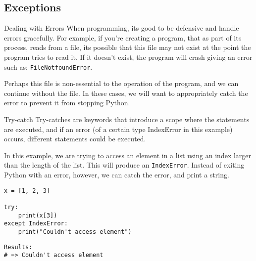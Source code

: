 \documentclass[10pt]{beamer}
\begin{document}
\subsection{Exceptions}
\label{sec:org1ebb98f}

\begin{frame}[label={sec:org4302f1e},fragile]{Dealing with Errors}
 When programming, its good to be defensive and handle errors gracefully. For example,
if you're creating a program, that as part of its process, reads from a file, its
possible that this file may not exist at the point the program tries to read it. If
it doesn't exist, the program will crash giving an error such as: \texttt{FileNotfoundError}.

Perhaps this file is non-essential to the operation of the program, and we can
continue without the file. In these cases, we will want to appropriately catch the
error to prevent it from stopping Python.
\end{frame}

\begin{frame}[label={sec:org99543ba},fragile]{Try-catch}
 Try-catches are keywords that introduce a scope where the statements are executed,
and if an error (of a certain type IndexError in this example) occurs, different
statements could be executed.

In this example, we are trying to access an element in a list using an index larger
than the length of the list. This will produce an \texttt{IndexError}. Instead of exiting
Python with an error, however, we can catch the error, and print a string.

\begin{verbatim}
x = [1, 2, 3]

try:
    print(x[3])
except IndexError:
    print("Couldn't access element")
\end{verbatim}

\begin{verbatim}
Results: 
# => Couldn't access element
\end{verbatim}
\end{frame}
\end{document}
